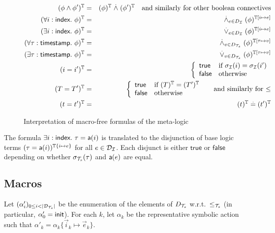 \begin{figure}
  \begin{eqnarray*}
    (\phi\wedge\phi')^{\mathbb{T}} &=& (\phi)^{\mathbb{T}} \stackrel{.}{\wedge} (\phi')^{\mathbb{T}}
    \quad \text{and similarly for other boolean connectives} \\
    (\forall i:\textsf{index}.~ \phi)^{\mathbb{T}} &=&
    \stackrel{.}{\wedge}_{e\in D_{\mathcal{I}}} (\phi)^{\mathbb{T}[i\mapsto e]} \\
    (\exists i:\textsf{index}.~ \phi)^{\mathbb{T}} &=&
    \stackrel{.}{\vee}_{e\in D_{\mathcal{I}}} (\phi)^{\mathbb{T}[i\mapsto e]} \\
    (\forall \tau:\textsf{timestamp}.~ \phi)^{\mathbb{T}} &=&
    \stackrel{.}{\wedge}_{v\in D_{\mathcal{T}_s}} (\phi)^{\mathbb{T}[\tau\mapsto v]} \\
    (\exists \tau:\textsf{timestamp}.~ \phi)^{\mathbb{T}} &=&
    \stackrel{.}{\vee}_{v\in D_{\mathcal{T}_s}} (\phi)^{\mathbb{T}[\tau\mapsto v]} \\
    (i=i')^{\mathbb{T}} &=&
    \left\{\begin{array}{ll}
      \mathsf{true} & \text{if } \sigma_{\mathcal{I}}(i)=\sigma_{\mathcal{I}}(i') \\
      \mathsf{false} & \text{otherwise}
    \end{array}\right. \\
    (T = T')^{\mathbb{T}} &=&
    \left\{\begin{array}{ll}
      \mathsf{true} & \text{if } (T)^{\mathbb{T}} = (T')^{\mathbb{T}} \\
      \mathsf{false} & \text{otherwise}
    \end{array}\right.
    \quad\text{ and similarly for $\leq$} \\
    (t=t')^{\mathbb{T}} &=& (t)^{\mathbb{T}} \stackrel{.}{=} (t')^{\mathbb{T}}
  \end{eqnarray*}
  \caption{Interpretation of macro-free formulas of the meta-logic}
  \label{fig:interpf}
\end{figure}

\begin{example}
  The formula
  $\exists i:\textsf{index}.~ \tau = \textsf{a}(i)$
  is translated to the disjunction of base logic terms
  $(\tau = \textsf{a}(i))^{\mathbb{T}\{i\mapsto e\}}$ for all $e \in \mathcal{D}_{\mathcal{I}}$.
  Each disjunct is either $\mathsf{true}$ or $\mathsf{false}$ depending on
  whether $\sigma_{\mathcal{T}_s}(\tau)$ and $\textsf{a}(e)$ are equal.
\end{example}

\subsection{Macros}
Let $(\alpha'_i)_{0 \leq i < |\mathcal{D}_{\mathcal{T}_s}|}$ be the enumeration of the elements
of $D_{\mathcal{T}_s}$ w.r.t.\ $\leq_{\mathcal{T}_s}$ (in particular, $\alpha'_0 = \mathsf{init}$).
For each $k$, let $\alpha_k$ be the representative symbolic action
such that $\alpha'_k = \alpha_k\{\vec{i}_k\mapsto\vec{e}_k\}$.


